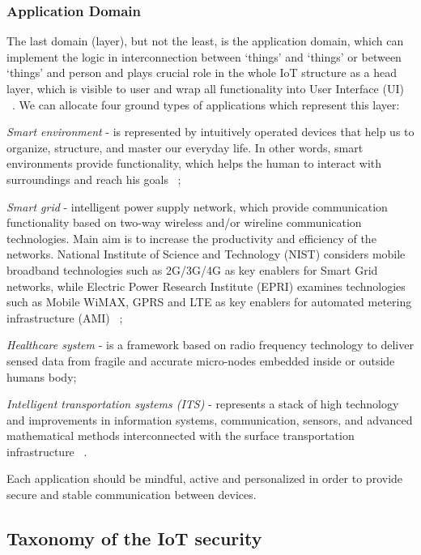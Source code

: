 \documentclass[12pt]{article}
\begin{document}
\subsubsection{Application Domain}
 The last domain (layer), but not the least, is the application domain, which can implement the logic in interconnection between ‘things’ and ‘things’ or between ‘things’ and person and plays crucial role in the whole IoT structure as a head layer, which is visible to user and wrap all functionality into User Interface (UI) ~\cite{IoTSur} ~\cite{SSAIoT}. We can allocate four ground types of applications which represent this layer:
\begin{enumerate*}[label=(\roman*)]
  \item \textit{Smart environment} - is represented by intuitively operated devices that help us to organize, structure, and master our everyday life. In other words, smart environments provide functionality, which helps the human to interact with surroundings and reach his goals  ~\cite{SE}; 
  \item \textit{Smart grid} - intelligent power supply network, which provide communication functionality based on two-way wireless and/or wireline communication technologies. Main aim is to increase the productivity and efficiency of the networks. National Institute of Science and Technology (NIST)  considers mobile broadband technologies such as 2G/3G/4G as key enablers for Smart Grid networks, while Electric Power Research Institute (EPRI) examines technologies such as Mobile WiMAX, GPRS and LTE as key enablers for automated metering infrastructure (AMI) ~\cite{SMG}; 
  \item \textit{Healthcare system} - is a framework based on radio frequency technology to deliver sensed data from fragile and accurate micro-nodes embedded inside or outside humans body;
  \item \textit{Intelligent transportation systems (ITS)} - represents a stack of high technology and improvements in information systems, communication, sensors, and advanced mathematical methods interconnected with the surface transportation infrastructure ~\cite{ITS}.
\end{enumerate*}

Each application should be mindful, active and personalized in order to provide secure and stable communication between devices. 
 
\subsection{Taxonomy of the IoT security}
\end{document}
